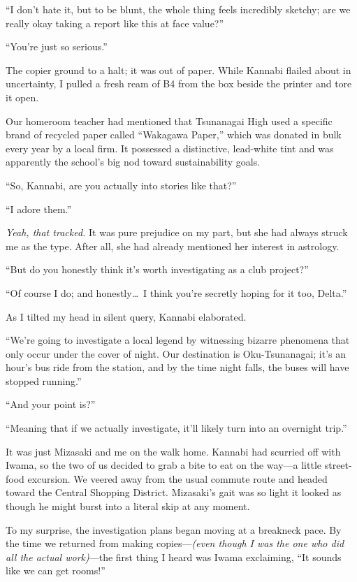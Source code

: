 \documentclass[
    a4paper,
    12pt,
    twoside,
    openany,
    UTF8,
    fontset=windows
]{ctexbook}
\begin{document}
``I don't hate it, but to be blunt, the whole thing feels incredibly sketchy; are we really okay taking a report like this at face value?''

``You're just so serious.''

The copier ground to a halt; it was out of paper. While Kannabi flailed about in uncertainty, I pulled a fresh ream of B4 from the box beside the printer and tore it open.

Our homeroom teacher had mentioned that Tsunanagai High used a specific brand of recycled paper called ``Wakagawa Paper,'' which was donated in bulk every year by a local firm. It possessed a distinctive, lead-white tint and was apparently the school's big nod toward sustainability goals.

``So, Kannabi, are you actually into stories like that?''

``I adore them.''

\textit{Yeah, that tracked.} It was pure prejudice on my part, but she had always struck me as the type. After all, she had already mentioned her interest in astrology.

``But do you honestly think it's worth investigating as a club project?''

``Of course I do; and honestly\dots\ I think you're secretly hoping for it too, Delta.''

As I tilted my head in silent query, Kannabi elaborated.

``We're going to investigate a local legend by witnessing bizarre phenomena that only occur under the cover of night. Our destination is Oku-Tsunanagai; it's an hour's bus ride from the station, and by the time night falls, the buses will have stopped running.''

``And your point is?''

``Meaning that if we actually investigate, it'll likely turn into an overnight trip.''

It was just Mizasaki and me on the walk home. Kannabi had scurried off with Iwama, so the two of us decided to grab a bite to eat on the way---a little street-food excursion. We veered away from the usual commute route and headed toward the Central Shopping District. Mizasaki's gait was so light it looked as though he might burst into a literal skip at any moment.

To my surprise, the investigation plans began moving at a breakneck pace. By the time we returned from making copies---\textit{(even though I was the one who did all the actual work)}---the first thing I heard was Iwama exclaiming, ``It sounds like we can get rooms!''
\end{document}
